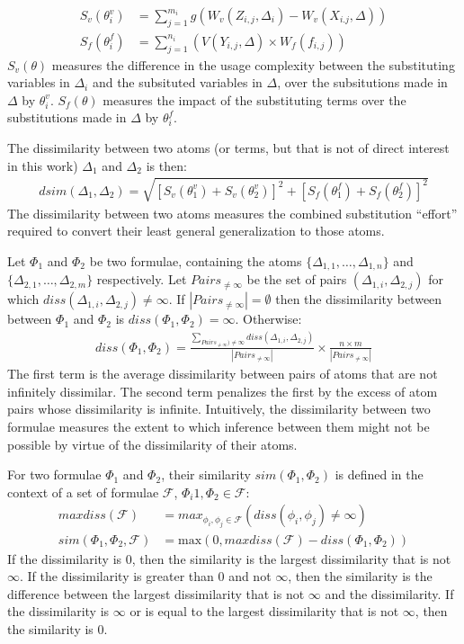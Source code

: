 \documentclass[EPiC]{easychair}
\begin{document}
\begin{align}
S_v(\theta_i^v) &= \sum_{j=1}^{m_i} g(W_v(Z_{i,j},\Delta_i) - W_v(X_{i.j},\Delta)) \\
S_f(\theta_i^f) &= \sum_{j=1}^{n_i} (V(Y_{i,j},\Delta) \times W_f(f_{i,j}))
\end{align}
$S_v(\theta)$ measures the difference in the usage complexity between
the substituting variables in $\Delta_i$ and the subsituted variables 
in $\Delta$, over the subsitutions made in $\Delta$ by $\theta_i^v$.
$S_f(\theta)$ measures the impact of the substituting terms over the 
substitutions made in $\Delta$ by $\theta_i^f$.

The dissimilarity between two atoms (or terms, but that is not of direct
interest in this work) $\Delta_1$ and $\Delta_2$ is then:
\begin{align}
dsim(\Delta_1,\Delta_2) = \sqrt{[S_v(\theta_1^v)+S_v(\theta_2^v)]^2+[S_f(\theta_1^f)+S_f(\theta_2^f)]^2}
\end{align}
The dissimilarity between two atoms measures the combined substitution
``effort'' required to convert their least general generalization to those 
atoms.

Let $\Phi_1$ and $\Phi_2$ be two formulae, containing the atoms
$\{\Delta_{1,1},\dots,\Delta_{1,n}\}$ and 
$\{\Delta_{2,1},\dots,\Delta_{2,m}\}$ respectively.
Let $Pairs_{\neq\infty}$ be the set of pairs $(\Delta_{1,i},\Delta_{2,j})$ 
for which $diss(\Delta_{1,i},\Delta_{2,j}) \neq \infty$.
If $|Pairs_{\neq\infty}| = \emptyset$ then the dissimilarity between
between $\Phi_1$ and $\Phi_2$ is $diss(\Phi_1,\Phi_2) = \infty$.
Otherwise:
\begin{align}
diss(\Phi_1,\Phi_2) = 
\frac{\sum_{Pairs_{\neq\infty}) \neq \infty}diss(\Delta_{1,i},\Delta_{2,j})}
{|Pairs_{\neq\infty}|}
\times
\frac{n \times m}{|Pairs_{\neq\infty}|} 
\end{align}
The first term is the average dissimilarity between pairs of atoms that are 
not infinitely dissimilar.
The second term penalizes the first by the excess of atom pairs whose
dissimilarity is infinite.
Intuitively, the dissimilarity between two formulae measures the extent 
to which inference between them might not be possible by virtue of the 
dissimilarity of their atoms.

For two formulae $\Phi_1$ and $\Phi_2$, their similarity $sim(\Phi_1,\Phi_2)$
is defined in the context of a set of formulae $\mathcal{F}$, 
$\Phi_i1,\Phi_2 \in \mathcal{F}$:
\begin{align}
maxdiss(\mathcal{F}) &= max_{\phi_i,\phi_j \in \mathcal{F}} (diss(\phi_i,\phi_j) \neq \infty) \\
sim(\Phi_1,\Phi_2,\mathcal{F}) &= \textrm{max}(0, maxdiss(\mathcal{F}) - diss(\Phi_1,\Phi_2))
\end{align}
If the dissimilarity is $0$, then the similarity is the largest dissimilarity 
that is not $\infty$.
If the dissimilarity is greater than $0$ and not $\infty$, then the similarity 
is the difference between the largest dissimilarity that is not $\infty$ and 
the dissimilarity.
If the dissimilarity is $\infty$ or is equal to the largest 
dissimilarity that is not $\infty$, then the similarity is $0$.
\end{document}

